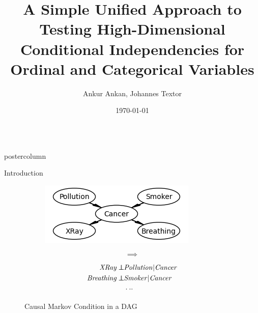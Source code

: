 \documentclass{beamer}
\title{\huge A Simple Unified Approach to Testing High-Dimensional Conditional Independencies for Ordinal and Categorical Variables}
\author{Ankur Ankan, Johannes Textor}
\institute[RU]{Institute for Computing and Information Sciences \\ Radboud University, Netherlands}
\date{\today}
\def\ci{\perp\!\!\!\!\!\perp}
\newlength{\columnheight}
\begin{document}
\begin{frame}
\begin{columns}
	\begin{column}{.33\textwidth}
		\begin{beamercolorbox}[center]{postercolumn}
			\begin{minipage}{.98\textwidth}  %
				\parbox[t][\columnheight]{\textwidth}{ %
					\begin{myblock}{Introduction}
						\begin{figure}
							\begin{subfigure}{0.38\textwidth}
								\centering
								\includegraphics[scale=1.5]{../in_person/imgs/example_dag.png}
							\end{subfigure}%
							\begin{subfigure}{0.1\textwidth}
								$$ \bm{\implies} $$
							\end{subfigure}%
							\begin{subfigure}{0.52\textwidth}
								\begin{equation*}
									\begin{split}
										\text{\emph{XRay}} \ci & \text{\emph{Pollution}} | \text{\emph{Cancer}} \\
										\text{\emph{Breathing}} \ci & \text{\emph{Smoker}} | \text{\emph{Cancer}} \\
										& \cdot \cdot \cdot \\
									\end{split}
								\end{equation*}
							\end{subfigure}
							\caption*{Causal Markov Condition in a DAG \footnotemark}
						\end{figure}


\end{myblock}}
\end{minipage}
\end{beamercolorbox}
\end{column}
\end{columns}
\end{frame}
\end{document}

